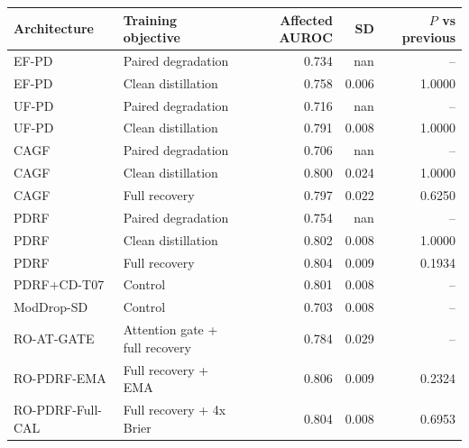 \begin{tabular}{llrrr}
\toprule
Architecture & Training objective & Affected AUROC & SD & $P$ vs previous \\
\midrule
EF-PD & Paired degradation & 0.734 & nan & -- \\
EF-PD & Clean distillation & 0.758 & 0.006 & 1.0000 \\
UF-PD & Paired degradation & 0.716 & nan & -- \\
UF-PD & Clean distillation & 0.791 & 0.008 & 1.0000 \\
CAGF & Paired degradation & 0.706 & nan & -- \\
CAGF & Clean distillation & 0.800 & 0.024 & 1.0000 \\
CAGF & Full recovery & 0.797 & 0.022 & 0.6250 \\
PDRF & Paired degradation & 0.754 & nan & -- \\
PDRF & Clean distillation & 0.802 & 0.008 & 1.0000 \\
PDRF & Full recovery & 0.804 & 0.009 & 0.1934 \\
PDRF+CD-T07 & Control & 0.801 & 0.008 & -- \\
ModDrop-SD & Control & 0.703 & 0.008 & -- \\
RO-AT-GATE & Attention gate + full recovery & 0.784 & 0.029 & -- \\
RO-PDRF-EMA & Full recovery + EMA & 0.806 & 0.009 & 0.2324 \\
RO-PDRF-Full-CAL & Full recovery + 4x Brier & 0.804 & 0.008 & 0.6953 \\
\bottomrule
\end{tabular}